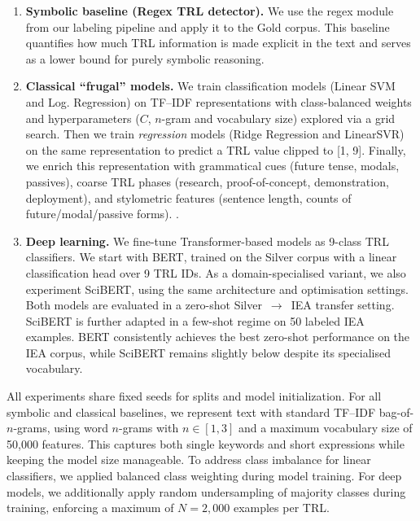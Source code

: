 \documentclass[runningheads]{llncs}
\begin{document}
\begin{enumerate}
    \item \textbf{Symbolic baseline (Regex TRL detector).} 
    We use the regex module from our labeling pipeline and apply it to the Gold corpus. This baseline quantifies how much TRL information is made explicit in the text
    and serves as a lower bound for purely symbolic reasoning.
    \item \textbf{Classical ``frugal'' models.} 
    We train classification  models (Linear SVM and Log. Regression) on TF--IDF representations  with class-balanced weights and hyperparameters ($C$, $n$-gram and vocabulary size) explored via a grid search.
    Then we train \emph{regression} models (Ridge Regression and LinearSVR) on the same representation to predict a 
    TRL value 
    clipped to [1, 9]. 
    Finally, we enrich this representation with grammatical cues (future tense, modals, passives), coarse TRL phases (research, proof-of-concept, demonstration, deployment), and stylometric features (sentence length, counts of future/modal/passive forms).
.    
    \item \textbf{Deep learning.} 
    We fine-tune Transformer-based models as 9-class TRL classifiers. We start with BERT, trained on the Silver corpus with a linear classification head over 9 TRL IDs. As a domain-specialised variant, we also experiment SciBERT, using the same architecture and optimisation settings. Both models are evaluated in a zero-shot Silver~$\to$~IEA transfer setting. SciBERT is further adapted in a few-shot regime on 50 labeled IEA examples. BERT consistently achieves the best zero-shot performance on the IEA corpus, while SciBERT remains slightly below despite its specialised vocabulary.
    
        
\end{enumerate}
All experiments share fixed seeds for splits and model initialization. For all symbolic and classical baselines, we
represent text with standard TF--IDF bag-of-$n$-grams, using word $n$-grams
with $n \in [1,3]$ and a maximum vocabulary size of 50{,}000 features. This
captures both single keywords and short expressions while keeping the model
size manageable. 
To address class imbalance for linear classifiers, we applied balanced class weighting during model training.
For deep models, we additionally apply random undersampling of majority classes during training, enforcing a maximum of $N=2,000$ examples per TRL. 
\end{document}
